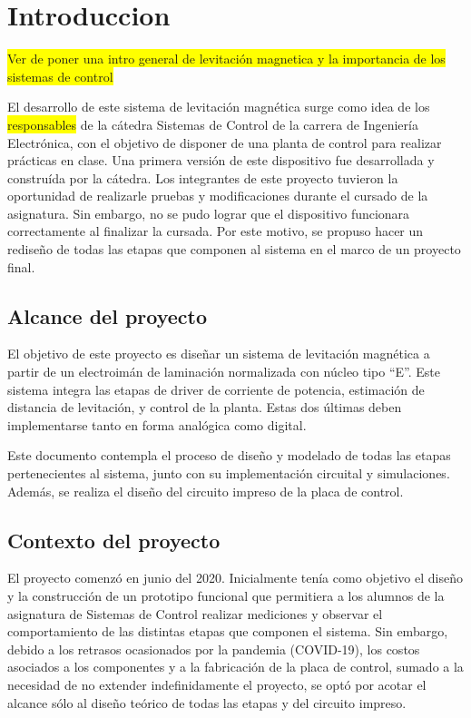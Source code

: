 \chapter{Introduccion}  \label{cap:Introducción}


\noindent \colorbox{yellow}{Ver de poner una intro general de levitación magnetica y la importancia de los sistemas de control}

\noindent El desarrollo de este sistema de levitación magnética surge como idea de los \colorbox{yellow}{responsables} de la cátedra Sistemas de Control de la carrera de Ingeniería Electrónica, con el objetivo de disponer de una planta de control para realizar prácticas en clase. Una primera versión de este dispositivo fue desarrollada y construída por la cátedra. Los integrantes de este proyecto tuvieron la oportunidad de realizarle pruebas y modificaciones durante el cursado de la asignatura. Sin embargo, no se pudo lograr que el dispositivo funcionara correctamente al finalizar la cursada. Por este motivo, se propuso hacer un rediseño de todas las etapas que componen al sistema en el marco de un proyecto final.



\section{Alcance del proyecto}

\noindent El objetivo de este proyecto es diseñar un sistema de levitación magnética a partir de un electroimán de laminación normalizada con núcleo tipo “E''. Este sistema integra las etapas de driver de corriente de potencia, estimación de distancia de levitación, y control de la planta. Estas dos últimas deben implementarse tanto en forma analógica como digital.

\noindent Este documento contempla el proceso de diseño y modelado de todas las etapas pertenecientes al sistema, junto con su implementación circuital y simulaciones. Además, se realiza el diseño del circuito impreso de la placa de control.



\section{Contexto del proyecto}

\noindent El proyecto comenzó en junio del 2020. Inicialmente tenía como objetivo el diseño y la construcción de un prototipo funcional que permitiera a los alumnos de la asignatura de Sistemas de Control realizar mediciones y observar el comportamiento de las distintas etapas que componen el sistema. Sin embargo, debido a los retrasos ocasionados por la pandemia (COVID-19), los costos asociados a los componentes y a la fabricación de la placa de control, sumado a la  necesidad de no extender indefinidamente el proyecto, se optó por acotar el alcance sólo al diseño teórico de todas las etapas y del circuito impreso.

